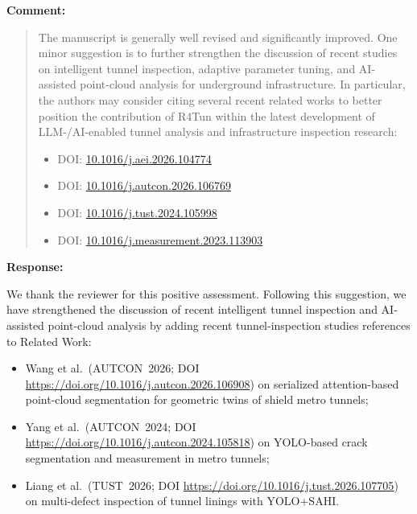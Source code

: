 \documentclass[11pt,a4paper]{article}
\newenvironment{commentblock}{%
  \par\smallskip\noindent\textbf{Comment:}\par
  \begin{quote}\itshape\color{black}
}{%
  \end{quote}\smallskip
}
\newenvironment{responseblock}{%
  \par\smallskip\noindent\textbf{Response:}\par
  \begingroup\color{responsegreen}
}{%
  \endgroup\smallskip
}
\begin{document}
\begin{commentblock}
The manuscript is generally well revised and significantly improved. One minor suggestion is to further strengthen the discussion of recent studies on intelligent tunnel inspection, adaptive parameter tuning, and AI-assisted point-cloud analysis for underground infrastructure. In particular, the authors may consider citing several recent related works to better position the contribution of R4Tun within the latest development of LLM-/AI-enabled tunnel analysis and infrastructure inspection research:
\begin{itemize}[nosep]
  \item DOI: \url{10.1016/j.aei.2026.104774}
  \item DOI: \url{10.1016/j.autcon.2026.106769}
  \item DOI: \url{10.1016/j.tust.2024.105998}
  \item DOI: \url{10.1016/j.measurement.2023.113903}
\end{itemize}
\end{commentblock}
\begin{responseblock}
We thank the reviewer for this positive assessment. Following this suggestion, we have strengthened the discussion of recent intelligent tunnel inspection and AI-assisted point-cloud analysis by adding recent tunnel-inspection studies references to Related Work:
\begin{itemize}[nosep]
  \item Wang et al.\ (AUTCON~2026; DOI \url{https://doi.org/10.1016/j.autcon.2026.106908}) on serialized attention-based point-cloud segmentation for geometric twins of shield metro tunnels;
  \item Yang et al.\ (AUTCON~2024; DOI \url{https://doi.org/10.1016/j.autcon.2024.105818}) on YOLO-based crack segmentation and measurement in metro tunnels;
  \item Liang et al.\ (TUST~2026; DOI \url{https://doi.org/10.1016/j.tust.2026.107705}) on multi-defect inspection of tunnel linings with YOLO+SAHI.
\end{itemize}
\end{responseblock}
\end{document}
